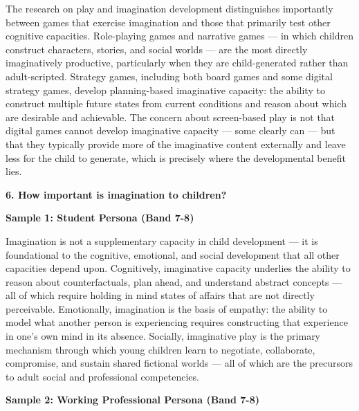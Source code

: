 The research on play and imagination development distinguishes importantly between games that exercise imagination and those that primarily test other cognitive capacities. Role-playing games and narrative games — in which children construct characters, stories, and social worlds — are the most directly imaginatively productive, particularly when they are child-generated rather than adult-scripted. Strategy games, including both board games and some digital strategy games, develop planning-based imaginative capacity: the ability to construct multiple future states from current conditions and reason about which are desirable and achievable. The concern about screen-based play is not that digital games cannot develop imaginative capacity — some clearly can — but that they typically provide more of the imaginative content externally and leave less for the child to generate, which is precisely where the developmental benefit lies.

\separator

\begin{ieltsquestion}
\textbf{6. How important is imagination to children?}
\end{ieltsquestion}
\textbf{Sample 1: Student Persona (Band 7-8)}

Imagination is not a supplementary capacity in child development — it is foundational to the cognitive, emotional, and social development that all other capacities depend upon. Cognitively, imaginative capacity underlies the ability to reason about counterfactuals, plan ahead, and understand abstract concepts — all of which require holding in mind states of affairs that are not directly perceivable. Emotionally, imagination is the basis of empathy: the ability to model what another person is experiencing requires constructing that experience in one's own mind in its absence. Socially, imaginative play is the primary mechanism through which young children learn to negotiate, collaborate, compromise, and sustain shared fictional worlds — all of which are the precursors to adult social and professional competencies.

\textbf{Sample 2: Working Professional Persona (Band 7-8)}

